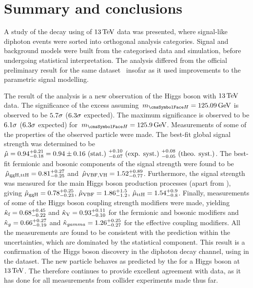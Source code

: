 \chapter{Summary and conclusions}
\label{chap:conclusions}

A study of the \Hgg decay using \thisanalysislumi\ifb of $13\,\text{Te\hspace{-.08em}V}$ data was presented, where signal-like diphoton events were sorted into orthogonal analysis categories.
Signal and background models were built from the categorised data and simulation, before undergoing statistical interpretation. The analysis differed from the official \CMS preliminary result for the same dataset~\cite{CMS-PAS-HIG-16-020} insofar as it used improvements to the parametric signal modelling. %

The result of the analysis is a new observation of the Higgs boson with $13\,\text{Te\hspace{-.08em}V}$ data. The significance of the excess assuming $\mH=125.09\GeV$ is observed to be $5.7\sigma$ ($6.3\sigma$ expected). The maximum significance is observed to be $6.1\sigma$ ($6.3\sigma$ expected) for $\mH=\bestFitGlobalMH\GeV$.
Measurements of some of the properties of the observed particle were made. The best-fit global signal strength was determined to be $\hat{\mu} = 0.94^{+0.21}_{-0.18} = 0.94 \pm 0.16 \text{~(stat.)~} ^{+0.10}_{-0.07} \text{~(exp. syst.)~} ^{+0.08}_{-0.05} \text{~(theo. syst.)}$. The best-fit fermionic and bosonic components of the signal strength were found to be $\,\hat{\mu}_{\text{ggH},\text{ttH}} = 0.81^{+0.27}_{-0.25}$ and $\,\hat{\mu}_{\text{VBF},\text{VH}} = 1.52^{+0.89}_{-0.77}$. Furthermore, the signal strength was measured for the main Higgs boson production processes (apart from \VH), giving $\hat{\mu}_{\text{ggH}} = 0.78^{+0.25}_{-0.23}$, $\hat{\mu}_{\text{VBF}} = 1.86^{+1.5}_{-1.2}$, $\hat{\mu}_{\text{ttH}} = 1.54^{+0.9}_{-0.8}$. Finally, measurements of some of the Higgs boson coupling strength modifiers were made, yielding $\hat{\kappa}_{\text{f}} = 0.68^{+0.45}_{-0.22}$ and $\hat{\kappa}_{\text{V}} = 0.93^{+0.11}_{-0.10}$ for the fermionic and bosonic modifiers and $\hat{\kappa}_{g} = 0.66^{+0.27}_{-0.19}$ and $\hat{\kappa}_{gamma} = 1.26^{+0.25}_{-0.27}$ for the effective coupling modifiers.
All the measurements are found to be consistent with the \SM prediction within the uncertainties, which are dominated by the statistical component. 
This result is a confirmation of the Higgs boson discovery in the diphoton decay channel, using in the \RunII dataset. 
The new particle behaves as predicted by the \SM for a Higgs boson at $13\,\text{Te\hspace{-.08em}V}$. The \SM therefore continues to provide excellent agreement with data, as it has done for all measurements from collider experiments made thus far.
 
